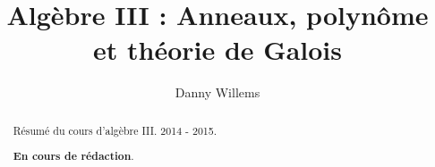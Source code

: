 \documentclass[a4paper, 12pt]{report}
\title{Algèbre III : Anneaux, polynôme et théorie de Galois}
\author{Danny Willems}
\begin{document}
\maketitle

\begin{abstract}
	Résumé du cours d'algèbre III. 2014 - 2015.
	
	\textbf{En cours de rédaction}.
\end{abstract}

\tableofcontents



\end{document}
